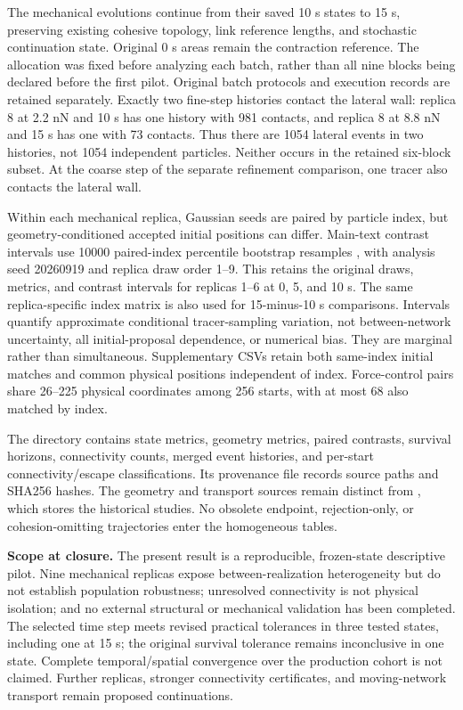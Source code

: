 \documentclass[a4paper,10pt]{article}
\numberwithin{equation}{section}
\begin{document}
The mechanical evolutions continue from their saved 10 s states to 15 s, preserving existing cohesive topology, link reference lengths, and stochastic continuation state. Original 0 s areas remain the contraction reference. The allocation was fixed before analyzing each batch, rather than all nine blocks being declared before the first pilot. Original batch protocols and execution records are retained separately. Exactly two fine-step histories contact the lateral wall: replica 8 at 2.2 nN and 10 s has one history with 981 contacts, and replica 8 at 8.8 nN and 15 s has one with 73 contacts. Thus there are 1054 lateral events in two histories, not 1054 independent particles. Neither occurs in the retained six-block subset. At the coarse step of the separate refinement comparison, one tracer also contacts the lateral wall.

Within each mechanical replica, Gaussian seeds are paired by particle index, but geometry-conditioned accepted initial positions can differ. Main-text contrast intervals use 10000 paired-index percentile bootstrap resamples \cite{Efron1979}, with analysis seed 20260919 and replica draw order 1--9. This retains the original draws, metrics, and contrast intervals for replicas 1--6 at 0, 5, and 10 s. The same replica-specific index matrix is also used for 15-minus-10 s comparisons. Intervals quantify approximate conditional tracer-sampling variation, not between-network uncertainty, all initial-proposal dependence, or numerical bias. They are marginal rather than simultaneous. Supplementary CSVs retain both same-index initial matches and common physical positions independent of index. Force-control pairs share 26--225 physical coordinates among 256 starts, with at most 68 also matched by index.

The directory  contains state metrics, geometry metrics, paired contrasts, survival horizons, connectivity counts, merged event histories, and per-start connectivity/escape classifications. Its provenance file records source paths and SHA256 hashes. The geometry and transport sources remain distinct from , which stores the historical studies. No obsolete endpoint, rejection-only, or cohesion-omitting trajectories enter the homogeneous tables.

\textbf{Scope at closure.} The present result is a reproducible, frozen-state descriptive pilot. Nine mechanical replicas expose between-realization heterogeneity but do not establish population robustness; unresolved connectivity is not physical isolation; and no external structural or mechanical validation has been completed. The selected time step meets revised practical tolerances in three tested states, including one at 15 s; the original survival tolerance remains inconclusive in one state. Complete temporal/spatial convergence over the production cohort is not claimed. Further replicas, stronger connectivity certificates, and moving-network transport remain proposed continuations.


\begingroup
\small
\setlength{\parskip}{0pt}

\endgroup
\end{document}
